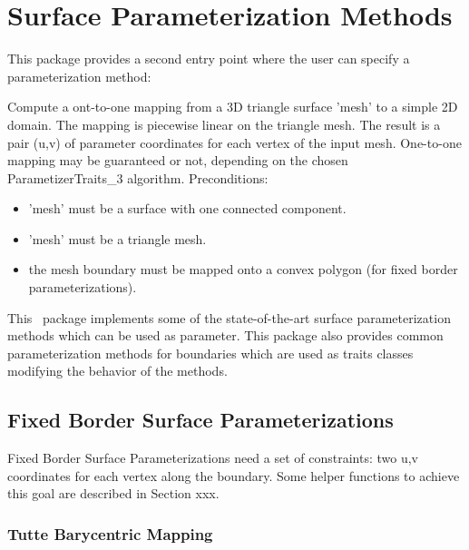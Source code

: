 \section{Surface Parameterization Methods}


This package provides a second  entry point
where the user can specify a parameterization method:

{ Compute a ont-to-one mapping from a 3D triangle surface 'mesh' to a
simple 2D domain. The mapping is piecewise linear on the triangle
mesh. The result is a pair (u,v) of parameter coordinates for each
vertex of the input mesh.  One-to-one mapping may be guaranteed or
not, depending on the chosen ParametizerTraits\_3 algorithm.
Preconditions:\begin{itemize}
\item 'mesh' must be a surface with one connected component.\item
'mesh' must be a triangle mesh.\item the mesh boundary must be mapped
onto a convex polygon (for fixed border
parameterizations).\end{itemize} }


This \cgal\ package implements some of the state-of-the-art surface
parameterization methods which can be used as
 parameter. This package also provides common parameterization methods for
boundaries which are used as traits classes modifying the behavior of
the  methods.


\subsection{Fixed Border Surface Parameterizations}


Fixed Border Surface Parameterizations need a set of constraints: two
u,v coordinates for each vertex along the boundary. Some helper
functions to achieve this goal are described in Section xxx.


\subsubsection{Tutte Barycentric Mapping}

